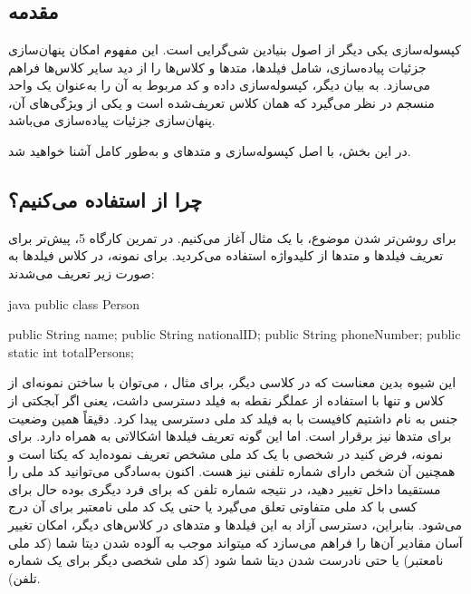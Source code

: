 \chapter{\DocTitle}
\section{مقدمه}

کپسوله‌سازی  یکی دیگر از اصول بنیادین شی‌گرایی است.
این مفهوم امکان پنهان‌سازی جزئیات پیاده‌سازی، شامل فیلدها، متدها و کلاس‌ها
را از دید سایر کلاس‌ها فراهم می‌سازد. به بیان دیگر، کپسوله‌سازی داده و کد
مربوط به آن را به‌عنوان یک واحد منسجم در نظر می‌گیرد که همان کلاس تعریف‌شده
است و یکی از ویژگی‌های آن، پنهان‌سازی جزئیات پیاده‌سازی می‌باشد.

در این بخش، با اصل کپسوله‌سازی و متدهای  و
 به‌طور کامل آشنا خواهید شد.

\section{چرا از  استفاده می‌کنیم؟}

برای روشن‌تر شدن موضوع، با یک مثال آغاز می‌کنیم. در تمرین کارگاه 5، پیش‌تر
برای تعریف فیلدها و متدها از کلیدواژه  استفاده
می‌کردید. برای نمونه، در کلاس  فیلدها به صورت زیر تعریف
می‌شدند:

\begin{codebox}{java}
public class Person {
    public String name;
    public String nationalID;
    public String phoneNumber;
    public static int totalPersons;
    
}
\end{codebox}

این شیوه بدین معناست که در کلاسی دیگر، برای مثال  ،
می‌توان با ساختن نمونه‌ای از کلاس  و تنها با استفاده
از عملگر نقطه به فیلد  دسترسی داشت، یعنی اگر
آبجکتی از جنس  به نام  داشتیم
کافیست با  به فیلد کد ملی 
دسترسی پیدا کرد. دقیقاً همین وضعیت برای متدها نیز برقرار است. اما این
گونه تعریف فیلدها اشکالاتی به همراه دارد. برای نمونه، فرض کنید در
 شخصی با یک کد ملی مشخص تعریف نموده‌اید که یکتا است و
همچنین آن شخص دارای شماره تلفنی نیز هست. اکنون به‌سادگی می‌توانید کد ملی
را مستقیما داخل  تغییر دهید، در نتیجه شماره تلفن که
برای فرد دیگری بوده حال برای کسی با کد ملی متفاوتی تعلق می‌گیرد یا حتی یک
کد ملی نامعتبر برای آن درج می‌شود. بنابراین، دسترسی آزاد به این فیلدها و
متدهای  در کلاس‌های دیگر، امکان تغییر آسان مقادیر
آن‌ها را فراهم می‌سازد که میتواند موجب به آلوده شدن دیتا شما (کد ملی
نامعتبر) یا حتی نادرست شدن دیتا شما شود (کد ملی شخصی دیگر برای یک شماره
تلفن).

